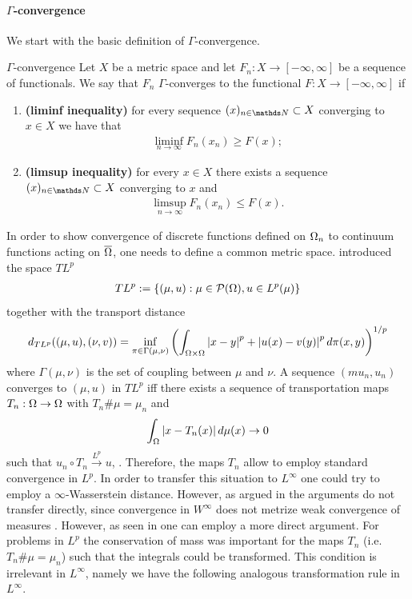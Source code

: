\paragraph{$\Gamma$-convergence}
%
We start with the basic definition of $\Gamma$-convergence.
%
%
\begin{definition}{$\Gamma$-convergence}{}
Let $X$ be a metric space and let $F_n:X\rightarrow [-\infty,\infty]$ be a sequence of 
functionals. We say that $F_n$ $\Gamma$-converges to the functional 
$F:X\rightarrow [-\infty,\infty]$ if
\begin{enumerate}[label=(\roman*)]
\item \textbf{(liminf inequality)} for every sequence $(x)_{n\in\N}\subset X$ converging to 
$x\in X$ we have that
\begin{align*}
\liminf_{n\rightarrow\infty} F_n(x_n) \geq F(x);
\end{align*}
\item\textbf{(limsup inequality)} for every $x\in X$ there exists a sequence 
$(x)_{n\in\N}\subset X$ converging to $x$ and 
\begin{align*}
\limsup_{n\rightarrow\infty} F_n(x_n)\leq F(x).
\end{align*}
\end{enumerate}
\end{definition}
%
%
In order to show convergence of discrete functions defined on $\Omega_n$ to continuum functions acting on $\overline{\Omega}$, one needs to define a common metric space. \cite{GarcSlep15} introduced the space $TL^p$
%
\begin{align*}
TL^p :=\left\{(\mu, u): \mu\in \mathcal{P}(\Omega), u\in L^p(\mu)\right\}
\end{align*}
%
together with the transport distance
%
\begin{align*}
d_{TL^p}((\mu, u), (\nu, v)) = \inf_{\pi\in \Gamma(\mu,\nu)}
\left(\int_{\Omega\times\Omega} \left|x-y\right|^p + \left|u(x) - v(y)\right|^p d\pi(x,y)\right)^{1/p}
\end{align*}
%
where $\Gamma(\mu,\nu)$ is the set of coupling between $\mu$ and $\nu$. A sequence $(mu_n, u_n)$ converges to $(\mu,u)$ in $TL^p$ iff there exists a sequence of transportation maps $T_n:\Omega\to\Omega$ with $T_n\#\mu = \mu_n$ and 
%
\begin{align*}
\int_{\Omega} \left|x- T_n(x)\right| d\mu(x)\rightarrow 0
\end{align*}
%
such that $u_n\circ T_n \xrightarrow{L^p} u$, \cite[Prop. 3.12]{GarcSlep15}. Therefore, the maps $T_n$ allow to employ standard convergence in $L^p$. In order to transfer this situation to $L^\infty$ one could try to employ a $\infty$-Wasserstein distance. However, as argued in \cite{roith2022msc} the arguments do not transfer directly, since convergence in $W^\infty$ does not metrize weak convergence of measures \cite[Thm. 5.10]{santambrogio2015optimal}. However, as seen in \cite{roith2022continuum} one can employ a more direct argument. For problems in $L^p$ the conservation of mass was important for the maps $T_n$ (i.e. $T_n\#\mu = \mu_n$) such that the integrals could be transformed. This condition is irrelevant in $L^\infty$, namely we have the following analogous transformation rule in $L^\infty$.
